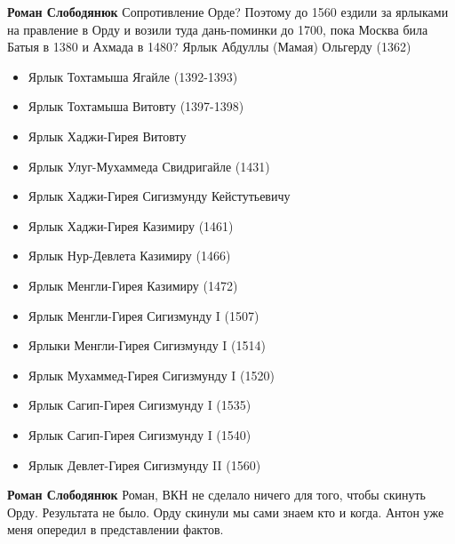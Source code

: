 \begin{itemize}
\begin{itemize}
 
\textbf{Роман Слободянюк} Сопротивление Орде? Поэтому до 1560 ездили за ярлыками на правление в Орду и возили туда дань-поминки до 1700, пока Москва била Батыя в 1380 и Ахмада в 1480? Ярлык Абдуллы (Мамая) Ольгерду (1362)


\begin{itemize}
  \item Ярлык Тохтамыша Ягайле (1392-1393)
  \item Ярлык Тохтамыша Витовту (1397-1398)
  \item Ярлык Хаджи-Гирея Витовту
  \item Ярлык Улуг-Мухаммеда Свидригайле (1431)
  \item Ярлык Хаджи-Гирея Сигизмунду Кейстутьевичу
  \item Ярлык Хаджи-Гирея Казимиру (1461)
  \item Ярлык Нур-Девлета Казимиру (1466)
  \item Ярлык Менгли-Гирея Казимиру (1472)
  \item Ярлык Менгли-Гирея Сигизмунду I (1507)
  \item Ярлыки Менгли-Гирея Сигизмунду I (1514)
  \item Ярлык Мухаммед-Гирея Сигизмунду I (1520)
  \item Ярлык Сагип-Гирея Сигизмунду I (1535)
  \item Ярлык Сагип-Гирея Сигизмунду I (1540)
  \item Ярлык Девлет-Гирея Сигизмунду II (1560)
\end{itemize}

 
\textbf{Роман Слободянюк} Роман, ВКН не сделало ничего для того, чтобы скинуть Орду. Результата не было. Орду скинули мы сами знаем кто и когда. Антон уже меня опередил в представлении фактов.

 

\end{itemize}
\end{itemize}
